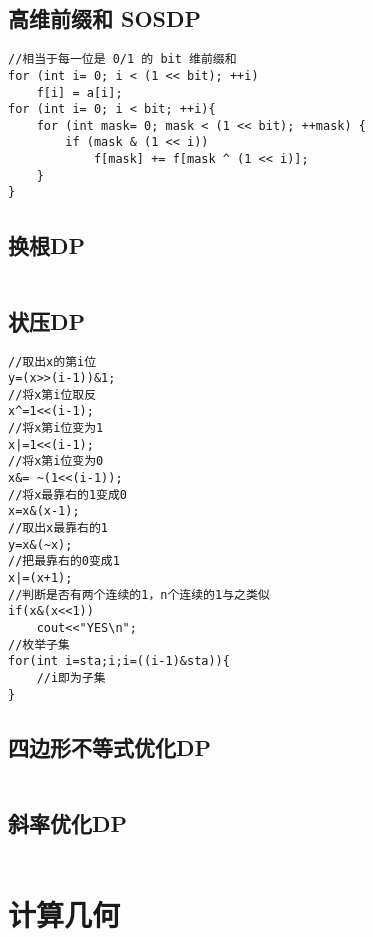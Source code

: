 \documentclass[twocolumn,a4]{article}
\begin{document}
\subsection{高维前缀和 SOSDP}
\begin{lstlisting}
//相当于每一位是 0/1 的 bit 维前缀和
for (int i= 0; i < (1 << bit); ++i)
    f[i] = a[i];
for (int i= 0; i < bit; ++i){
	for (int mask= 0; mask < (1 << bit); ++mask) {
        if (mask & (1 << i))
            f[mask] += f[mask ^ (1 << i)];
    }
}
\end{lstlisting}


\subsection{换根DP}
\begin{lstlisting}

\end{lstlisting}

\subsection{状压DP}
\begin{lstlisting}
//取出x的第i位
y=(x>>(i-1))&1;
//将x第i位取反
x^=1<<(i-1);
//将x第i位变为1
x|=1<<(i-1);
//将x第i位变为0
x&= ~(1<<(i-1));
//将x最靠右的1变成0
x=x&(x-1);
//取出x最靠右的1
y=x&(~x);
//把最靠右的0变成1
x|=(x+1);
//判断是否有两个连续的1，n个连续的1与之类似
if(x&(x<<1))
    cout<<"YES\n";
//枚举子集
for(int i=sta;i;i=((i-1)&sta)){
    //i即为子集
}
\end{lstlisting}

\subsection{四边形不等式优化DP}
\begin{lstlisting}

\end{lstlisting}

\subsection{斜率优化DP}
\begin{lstlisting}

\end{lstlisting}

\section{计算几何}
\end{document}
